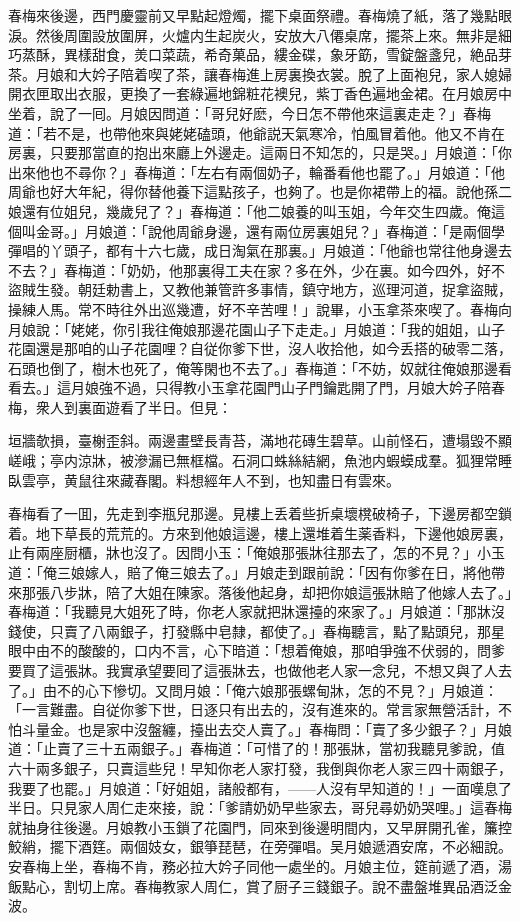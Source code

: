 春梅來後邊，西門慶靈前又早點起燈燭，擺下桌面祭禮。春梅燒了紙，落了幾點眼淚。然後周圍設放圍屏，火爐内生起炭火，安放大八僊桌席，擺茶上來。無非是細巧蒸酥，異樣甜食，羙口菜蔬，希奇菓品，縷金碟，象牙筯，雪錠盤盞兒，絶品芽茶。月娘和大妗子陪着喫了茶，讓春梅進上房裏換衣裳。脫了上面袍兒，家人媳婦開衣匣取出衣服，更換了一套綠遍地錦粧花襖兒，紫丁香色遍地金裙。在月娘房中坐着，說了一囘。月娘因問道：「哥兒好麽，今日怎不帶他來這裏走走？」春梅道：「若不是，也帶他來與姥姥磕頭，他爺説天氣寒冷，怕風冒着他。他又不肯在房裏，只要那當直的抱出來廳上外邊走。這兩日不知怎的，只是哭。」月娘道：「你出來他也不尋你？」春梅道：「左右有兩個奶子，輪番看他也罷了。」月娘道：「他周爺也好大年紀，得你替他養下這點孩子，也夠了。也是你裙帶上的福。說他孫二娘還有位姐兒，幾歲兒了？」春梅道：「他二娘養的叫玉姐，今年交生四歲。俺這個叫金哥。」月娘道：「說他周爺身邊，還有兩位房裏姐兒？」春梅道：「是兩個學彈唱的丫頭子，都有十六七歲，成日淘氣在那裏。」月娘道：「他爺也常往他身邊去不去？」春梅道：「奶奶，他那裏得工夫在家？多在外，少在裏。如今四外，好不盜賊生發。朝廷勅書上，又教他兼管許多事情，鎮守地方，巡理河道，捉拿盜賊，操練人馬。常不時往外出巡幾遭，好不辛苦哩！」說畢，小玉拿茶來喫了。春梅向月娘說：「姥姥，你引我往俺娘那邊花園山子下走走。」月娘道：「我的姐姐，山子花園還是那咱的山子花園哩？自従你爹下世，沒人收拾他，如今丢搭的破零二落，石頭也倒了，樹木也死了，俺等閑也不去了。」春梅道：「不妨，奴就往俺娘那邊看看去。」這月娘強不過，只得教小玉拿花園門山子門鑰匙開了門，月娘大妗子陪春梅，衆人到裏面遊看了半日。但見：

\begin{myquote}
垣牆欹損，臺榭歪斜。兩邊畫壁長青苔，滿地花磚生碧草。山前怪石，遭塌毀不顯嵯峨；亭内涼牀，被滲漏已無框檔。石洞口蛛絲結網，魚池内蝦蟆成羣。狐狸常睡臥雲亭，黄鼠往來藏春閣。料想經年人不到，也知盡日有雲來。
\end{myquote}

春梅看了一囬，先走到李瓶兒那邊。見樓上丢着些折桌壞櫈破椅子，下邊房都空鎖着。地下草長的荒荒的。方來到他娘這邊，樓上還堆着生薬香料，下邊他娘房裏，止有兩座厨櫃，牀也沒了。因問小玉：「俺娘那張牀往那去了，怎的不見？」小玉道：「俺三娘嫁人，賠了俺三娘去了。」月娘走到跟前說：「因有你爹在日，將他帶來那張八步牀，陪了大姐在陳家。落後他起身，却把你娘這張牀賠了他嫁人去了。」春梅道：「我聽見大姐死了時，你老人家就把牀還擡的來家了。」月娘道：「那牀沒錢使，只賣了八兩銀子，打發縣中皂隸，都使了。」春梅聽言，點了點頭兒，那星眼中由不的酸酸的，口内不言，心下暗道：「想着俺娘，那咱爭強不伏弱的，問爹要買了這張牀。我實承望要囘了這張牀去，也做他老人家一念兒，不想又與了人去了。」由不的心下慘切。又問月娘：「俺六娘那張螺甸牀，怎的不見？」月娘道：「一言難盡。自従你爹下世，日逐只有出去的，沒有進來的。常言家無營活計，不怕斗量金。也是家中沒盤纏，擡出去交人賣了。」春梅問：「賣了多少銀子？」月娘道：「止賣了三十五兩銀子。」春梅道：「可惜了的！那張牀，當初我聽見爹說，值六十兩多銀子，只賣這些兒！早知你老人家打發，我倒與你老人家三四十兩銀子，我要了也罷。」月娘道：「好姐姐，諸般都有，——人沒有早知道的！」一面嘆息了半日。只見家人周仁走來接，說：「爹請奶奶早些家去，哥兒尋奶奶哭哩。」這春梅就抽身往後邊。月娘教小玉鎖了花園門，同來到後邊明間内，又早屏開孔雀，簾控鮫綃，擺下酒筳。兩個妓女，銀箏琵琶，在旁彈唱。吴月娘遞酒安席，不必細說。安春梅上坐，春梅不肯，務必拉大妗子同他一處坐的。月娘主位，筵前遞了酒，湯飯點心，割切上席。春梅教家人周仁，賞了厨子三錢銀子。說不盡盤堆異品酒泛金波。

